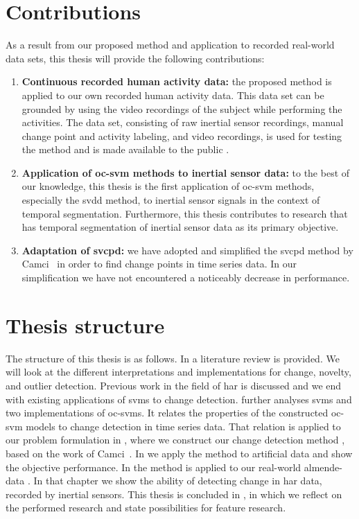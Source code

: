 \section{Contributions}\label{sec:intro_contributions}
As a result from our proposed method and application to recorded real-world data sets, this thesis will provide the following contributions:
\begin{enumerate}
  \item \textbf{Continuous recorded human activity data:} the proposed method is applied to our own recorded human activity data.
  This data set can be grounded by using the video recordings of the subject while performing the activities.
  The data set, consisting of raw inertial sensor recordings, manual change point and activity labeling, and video recordings, is used for testing the method and is made available to the public \cite{vlasveld2014acras}.
  \item \textbf{Application of \gls{oc-svm} methods to inertial sensor data:} to the best of our knowledge, this thesis is the first application of \gls{oc-svm} methods, especially the \gls{svdd} method, to inertial sensor signals in the context of temporal segmentation.
  Furthermore, this thesis contributes to research that has temporal segmentation of inertial sensor data as its primary objective.
  \item \textbf{Adaptation of \acrshort{svcpd}:} we have adopted and simplified the \acrshort{svcpd} method by Camci~\cite{camci2010change} in order to find change points in time series data.
  In our simplification we have not encountered a noticeably decrease in performance.
\end{enumerate}

\section{Thesis structure}\label{sec:intro_thesis_structure}
The structure of this thesis is as follows.
In  a literature review is provided.
We will look at the different interpretations and implementations for change, novelty, and outlier detection.
Previous work in the field of \gls{har} is discussed and we end with existing applications of \glspl{svm} to change detection.
 further analyses \glspl{svm} and two implementations of \glspl{oc-svm}.
It relates the properties of the constructed \gls{oc-svm} models to change detection in time series data.
That relation is applied to our problem formulation in , where we construct our change detection method , based on the work of Camci~\cite{camci2010change}.
In  we apply the method to artificial data and show the objective performance.
In  the method is applied to our real-world \gls{almende-data} \cite{vlasveld2014acras}.
In that chapter we show the ability of detecting change in \gls{har} data, recorded by inertial sensors.
This thesis is concluded in , in which we reflect on the performed research and state possibilities for feature research.